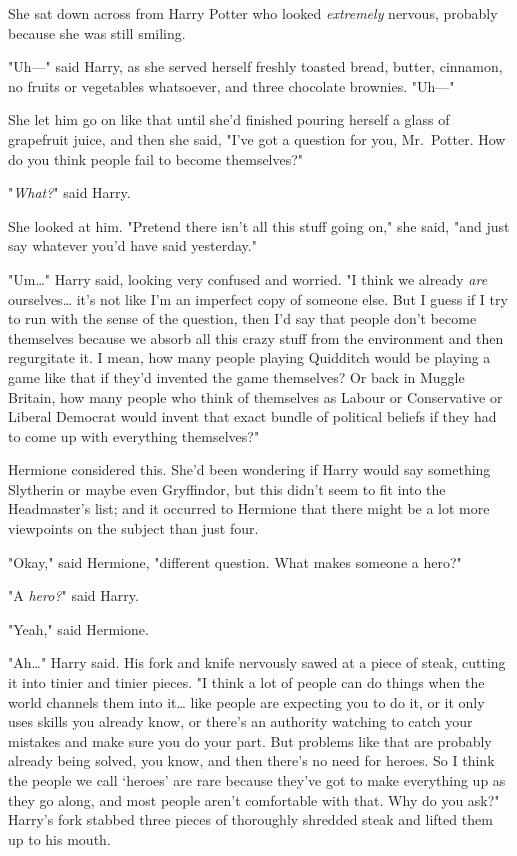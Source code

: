 She sat down across from Harry Potter who looked \emph{extremely} nervous,
probably because she was still smiling.

"Uh---" said Harry, as she served herself freshly toasted bread, butter,
cinnamon, no fruits or vegetables whatsoever, and three chocolate
brownies. "Uh---"

She let him go on like that until she'd finished pouring herself a glass of
grapefruit juice, and then she said, "I've got a question for you, Mr.~Potter.
How do you think people fail to become themselves?"

"\emph{What?}" said Harry.

She looked at him. "Pretend there isn't all this stuff going on," she said,
"and just say whatever you'd have said yesterday."

"Um{\ldots}" Harry said, looking very confused and worried. "I think we already
\emph{are} ourselves{\ldots} it's not like I'm an imperfect copy of someone
else. But I guess if I try to run with the sense of the question, then I'd say
that people don't become themselves because we absorb all this crazy stuff from
the environment and then regurgitate it. I mean, how many people playing
Quidditch would be playing a game like that if they'd invented the game
themselves? Or back in Muggle Britain, how many people who think of themselves
as Labour or Conservative or Liberal Democrat would invent that exact bundle of
political beliefs if they had to come up with everything themselves?"

Hermione considered this. She'd been wondering if Harry would say something
Slytherin or maybe even Gryffindor, but this didn't seem to fit into the
Headmaster's list; and it occurred to Hermione that there might be a lot more
viewpoints on the subject than just four.

"Okay," said Hermione, "different question. What makes someone a hero?"

"A \emph{hero?}" said Harry.

"Yeah," said Hermione.

"Ah{\ldots}" Harry said. His fork and knife nervously sawed at a piece of
steak, cutting it into tinier and tinier pieces. "I think a lot of people can
do things when the world channels them into it{\ldots} like people are
expecting you to do it, or it only uses skills you already know, or there's an
authority watching to catch your mistakes and make sure you do your part. But
problems like that are probably already being solved, you know, and then
there's no need for heroes. So I think the people we call `heroes' are rare
because they've got to make everything up as they go along, and most people
aren't comfortable with that. Why do you ask?" Harry's fork stabbed three
pieces of thoroughly shredded steak and lifted them up to his mouth.

